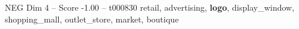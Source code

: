 \begin{textsample}{NEG Dim 4 – Score -1.00 – t000830}  \label{ex:f4_neg_001}
retail, advertising, \textbf{logo}, display\_window, shopping\_mall, outlet\_store, market, boutique

\end{textsample}
